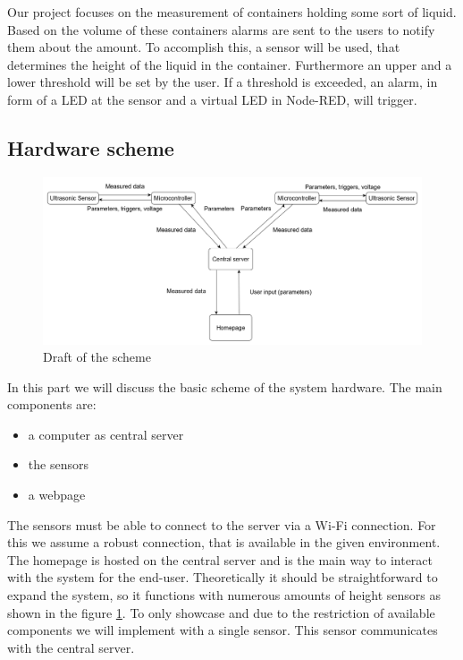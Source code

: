 \documentclass{article}
\begin{document}
Our project focuses on the measurement of containers holding some sort of liquid. Based on the volume of these containers alarms are sent to the users to notify them about the amount. To accomplish this, a sensor will be used, that determines the height of the liquid in the container. Furthermore an upper and a lower threshold will be set by the user. If a threshold is exceeded, an alarm, in form of a LED at the sensor and a virtual LED in Node-RED, will trigger.

\subsection{Hardware scheme}

\begin{figure}[]
  \hspace{-1.5cm} \includegraphics[scale=0.325]{images/circuit3.png}
  \caption{Draft of the scheme}
  \label{scheme}
\end{figure}

In this part we will discuss the basic scheme of the system hardware. The main components are:
\begin{itemize}
\item a computer as central server
\item the sensors
\item a webpage
\end{itemize}
The sensors must be able to connect to the server via a Wi-Fi connection. For this we assume a robust connection, that is available in the given environment. The homepage is hosted on the central server and is the main way to interact with the system for the end-user. Theoretically it should be straightforward to expand the system, so it functions with numerous amounts of height sensors as shown in the figure \ref{scheme}. To only showcase and due to the restriction of available components we will implement with a single sensor. This sensor communicates with the central server.
\end{document}

